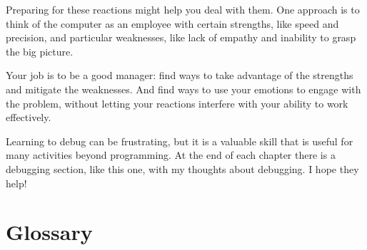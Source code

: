 \documentclass[10pt]{book}
\begin{document}

Preparing for these reactions might help you deal with them. One approach is to think of the computer as an employee with certain strengths, like speed and precision, and particular weaknesses, like lack of empathy and inability to grasp the big picture.

Your job is to be a good manager: find ways to take advantage of the strengths and mitigate the weaknesses.  And find ways to use your emotions to engage with the problem, without letting your reactions interfere with your ability to work effectively.

Learning to debug can be frustrating, but it is a valuable skill that is useful for many activities beyond programming.  At the end of each chapter there is a debugging section, like this one, with my thoughts about debugging.  I hope they help!


\section{Glossary}
\end{document}
